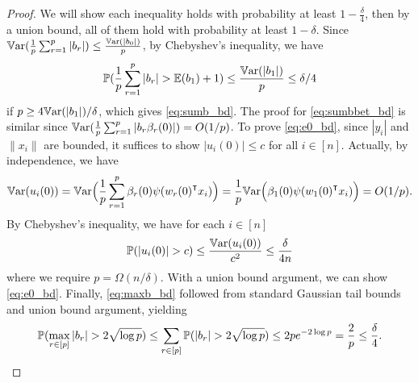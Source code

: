 \begin{proof}
We will show each inequality holds with probability at least $1-\frac{\delta}{4}$, then by a union bound, all of them hold with probability at least $1-\delta$. Since $\mathbb{V}\mathrm{ar}(\frac{1}{p}\sum_{r=1}^p|b_r|)\leq \frac{\mathbb{V}\mathrm{ar}(|b_0|)}{p}$, by Chebyshev's inequality, we have
\begin{equation*}
    \operatorname{\mathbb{P}}(\frac{1}{p}\sum_{r=1}^p|b_r| > \mathbb{E}(b_1) + 1) \leq \frac{\mathbb{V}\mathrm{ar}(|b_1|)}{p} \leq \delta/4
\end{equation*}
if $p\geq 4\mathbb{V}\mathrm{ar}(|b_1|)/\delta$, which gives \eqref{eq:sumb_bd}. The proof for \eqref{eq:sumbbet_bd} is similar since $\mathbb{V}\mathrm{ar}(\frac{1}{p}\sum_{r=1}^p|b_r\beta_r(0)|)=O(1/p)$. To prove \eqref{eq:e0_bd}, since $|y_i|$ and $\|x_i\|$ are bounded, it suffices to show $|u_i(0)|\leq c$ for all $i\in [n]$. Actually, by independence, we have
\begin{equation*}
    \Var(u_i(0)) = \Var \Big(\frac{1}{p}\sum_{r=1}^p \beta_r(0)\psi(w_r(0)\transpose x_i)\Big) = \frac{1}{p}\Var\Big(\beta_1(0)\psi(w_1(0)\transpose x_i)\Big) = O(1/p).
\end{equation*}
By Chebyshev's inequality, we have for each $i\in [n]$
\begin{equation*}
    \prob(|u_i(0)|> c) \leq \frac{\Var(u_i(0))}{c^2} \leq \frac{\delta}{4n}
\end{equation*}
where we require $p=\Omega(n/\delta)$. With a union bound argument, we can show \eqref{eq:e0_bd}. Finally, \eqref{eq:maxb_bd} followed from standard Gaussian tail bounds and union bound argument, yielding
\begin{equation*}
    \operatorname{\mathbb{P}}(\max_{r\in[p]}|b_r| > 2\sqrt{\log p}) \leq \sum_{r\in [p]}\operatorname{\mathbb{P}}(|b_r| > 2\sqrt{\log p}) \leq 2pe^{-2\log p} = \frac{2}{p} \leq \frac{\delta}{4}.
\end{equation*}
\end{proof}

